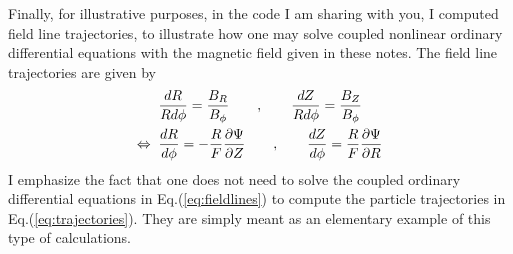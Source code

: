 \documentclass[a4]{article}
\begin{document}
\vspace{1em}
Finally, for illustrative purposes, in the code I am sharing with you, I computed field line trajectories, to illustrate how one may solve coupled nonlinear ordinary differential equations with the magnetic field given in these notes. The field line trajectories are given by
\begin{align}
&\frac{dR}{Rd\phi}=\frac{B_{R}}{B_{\phi}}\qquad,\qquad \frac{dZ}{Rd\phi}=\frac{B_{Z}}{B_{\phi}}\notag\\
\Leftrightarrow\;\;&\frac{dR}{d\phi}=-\frac{R}{F}\frac{\partial\Psi}{\partial Z}\qquad,\qquad \frac{dZ}{d\phi}=\frac{R}{F}\frac{\partial\Psi}{\partial R}\label{eq:fieldlines}
\end{align}
I emphasize the fact that one does not need to solve the coupled ordinary differential equations in Eq.(\ref{eq:fieldlines}) to compute the particle trajectories in Eq.(\ref{eq:trajectories}). They are simply meant as an elementary example of this type of calculations.
\end{document}
